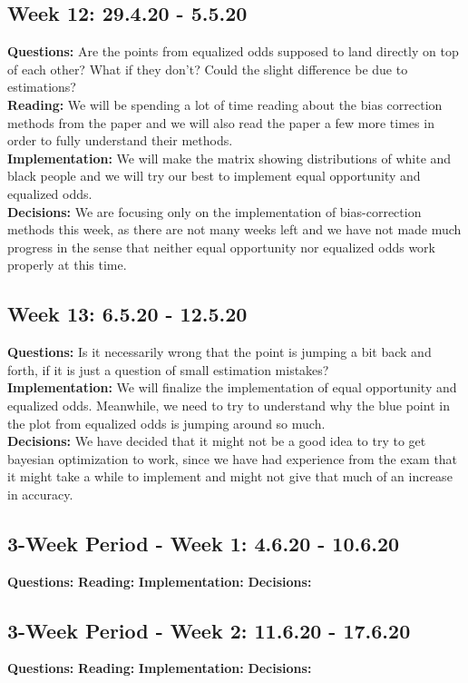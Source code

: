 \documentclass[11pt, fleqn]{article}
\begin{document}
\subsection*{Week 12: 29.4.20 - 5.5.20}
\textbf{Questions:} Are the points from equalized odds supposed to land directly on top of each other? What if they don't? Could the slight difference be due to estimations? \\
\textbf{Reading:} We will be spending a lot of time reading about the bias correction methods from the paper and we will also read the paper a few more times in order to fully understand their methods. \\
\textbf{Implementation:} We will make the matrix showing distributions of white and black people and we will try our best to implement equal opportunity and equalized odds. \\
\textbf{Decisions:} We are focusing only on the implementation of bias-correction methods this week, as there are not many weeks left and we have not made much progress in the sense that neither equal opportunity nor equalized odds work properly at this time.

\subsection*{Week 13: 6.5.20 - 12.5.20}
\textbf{Questions:} Is it necessarily wrong that the point is jumping a bit back and forth, if it is just a question of small estimation mistakes? \\
\textbf{Implementation:} We will finalize the implementation of equal opportunity and equalized odds. Meanwhile, we need to try to understand why the blue point in the plot from equalized odds is jumping around so much. \\
\textbf{Decisions:} We have decided that it might not be a good idea to try to get bayesian optimization to work, since we have had experience from the exam that it might take a while to implement and might not give that much of an increase in accuracy.

\subsection*{3-Week Period - Week 1: 4.6.20 - 10.6.20}
\textbf{Questions:} 
\textbf{Reading:} 
\textbf{Implementation:} 
\textbf{Decisions:} 

\subsection*{3-Week Period - Week 2: 11.6.20 - 17.6.20}
\textbf{Questions:} 
\textbf{Reading:} 
\textbf{Implementation:} 
\textbf{Decisions:} 
\end{document}
